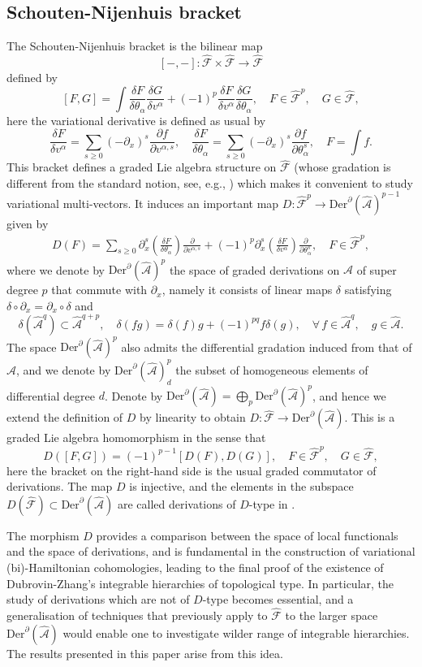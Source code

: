 \documentclass[11pt,a4paper]{amsart}
\numberwithin{equation}{section}
\newcommand{\derx}{\mathrm{Der}^{\qp}(\hm A)}
\newcommand{\diff}[2]{\frac{\partial #1}{\partial #2}}
\newcommand{\qa}{\alpha}
\newcommand{\qd}{\delta}
\newcommand{\qth}{\theta}
\newcommand{\qp}{\partial}
\newcommand{\vard}[2]{\frac{\delta #1}{\delta #2}}
\newcommand{\hm}[1]{\hat{\mathcal #1}}
\newcommand{\kk}[1]{\left(#1\right)}
\newcommand{\jjf}{\mathcal{\hat F}}
\numberwithin{equation}{section}
\begin{document}
\subsection{Schouten-Nijenhuis bracket}
The Schouten-Nijenhuis bracket is the bilinear map 
\[
[-,-]\colon \jjf\times\jjf\to\jjf
\]
defined by 
\[
[F,G] = \int \vard{F}{\qth_\qa}\vard{G}{v^\qa}+(-1)^p\vard{F}{v^\qa}\vard{G}{\qth_\qa},\quad F\in\jjf^p,\quad G\in\jjf,
\]
here the variational derivative is defined as usual by 
\[
\vard{F}{v^\qa} = \sum_{s\geq 0} (-\qp_x)^s\diff{f}{v^{\qa,s}},\quad \vard{F}{\qth_\qa} = \sum_{s\geq 0} (-\qp_x)^s\diff{f}{\qth^{s}_\qa},\quad F = \int f.
\]
This bracket defines a graded Lie algebra structure on $\jjf$ (whose gradation is different from the standard notion, see, e.g., \cite{LZJac}) which makes it convenient to study variational multi-vectors.  It induces an important map $D\colon \jjf^p\to \derx^{p-1}$  given by 
\begin{align}
  \label{AB}
D(F) = \sum_{s\geq 0}\qp_x^s\kk{\vard{F}{\qth_\qa}}\diff{}{v^{\qa,s}}+(-1)^p\qp_x^s\kk{\vard{F}{v^\qa}}\diff{}{\qth_\qa^s},\quad F\in\hm F^p,
\end{align}
where we denote by $\derx^{p}$ the space of graded derivations on $\hm A$  of super degree $p$ that commute with $\qp_x$, namely it consists of linear maps $\qd$ satisfying $\qd\circ\qp_x = \qp_x\circ\qd$ and 
\[
\qd(\hm A^q)\subset\hm A^{q+p},\quad \qd(fg) = \qd(f)g+(-1)^{pq}f\qd(g),\quad \forall\,f\in\hm A^q,\quad g\in\hm A.
\]  
The space $\derx^{p}$ also admits the differential gradation induced from that of $\hm A$, and we denote by $\derx^p_d$ the subset of homogeneous elements of differential degree $d$. Denote by $\derx = \bigoplus_p \derx^p$, and hence we extend the definition of $D$ by linearity to obtain $D\colon \hm F\to \derx$.   
This is a graded Lie algebra homomorphism in the sense that 
\begin{equation}
  \label{AC}
  D\kk{[F,G]} = (-1)^{p-1}[D(F),D(G)],\quad F\in\jjf^p,\quad G\in\jjf,
\end{equation}
here the bracket on the right-hand side is the usual graded commutator of derivations. The map $D$ is injective, and the elements in the subspace $D(\hm F)\subset\derx$ are called derivations of $D$-type in \cite{LWZ4}.

The morphism $D$ provides a comparison between the space of local functionals and the space of derivations, and is fundamental in the construction of variational (bi)-Hamiltonian cohomologies, leading to the final proof of the existence of Dubrovin-Zhang's integrable hierarchies of topological type. In particular, the study of derivations which are not of $D$-type becomes essential, and a generalisation of techniques that previously apply to $\hm F$ to the larger space $\derx$ would enable one to investigate wilder range of integrable hierarchies. The results presented in this paper arise from this idea.
\end{document}

